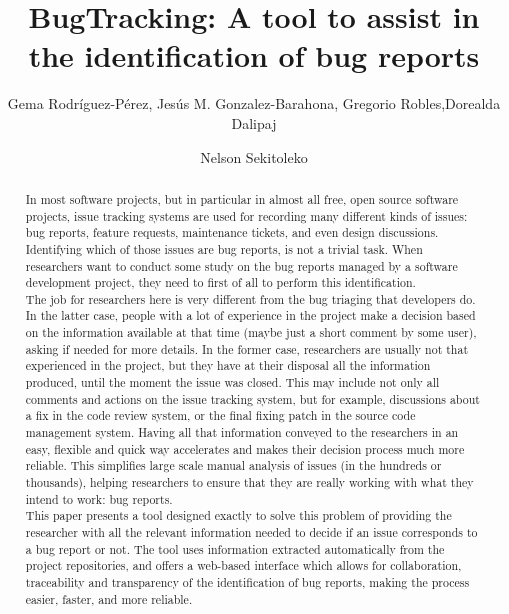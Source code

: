 \documentclass[ifip]{svmult}
\begin{document}
\title*{BugTracking: A tool to assist in the identification of bug reports}
\author{Gema Rodr\'iguez-P\'erez, Jes\'us M. Gonzalez-Barahona, Gregorio Robles,Dorealda Dalipaj \and Nelson Sekitoleko}
%
%
\maketitle

\begin{abstract}
	In most software projects, but in particular in almost all free, open source software projects, issue tracking systems are used for recording many different kinds of issues: bug reports, feature requests, maintenance tickets, and even design discussions. Identifying which of those issues are bug reports, is not a trivial task. When researchers want to conduct some study on the bug reports managed by a software development project, they need to first of all to perform this identification.\\

The job for researchers here is very different from the bug triaging that developers do. In the latter case, people with a lot of experience in the project make a decision based on the information available at that time (maybe just a short comment by some user), asking if needed for more details. In the former case, researchers are usually not that experienced in the project, but they have at their disposal all the information produced, until the moment the issue was closed. This may include not only all comments and actions on the issue tracking system, but for example, discussions about a fix in the code review system, or the final fixing patch in the source code management system. Having all that information conveyed to the researchers in an easy, flexible and quick way accelerates and makes their decision process much more reliable. This simplifies large scale manual analysis of issues (in the hundreds or thousands), helping researchers to ensure that they are really working with what they intend to work: bug reports.\\

This paper presents a tool designed exactly to solve this problem of providing the researcher with all the relevant information needed to decide if an issue corresponds to a bug report or not. The tool uses information extracted automatically from the project repositories, and offers a web-based interface which allows for collaboration, traceability and transparency of the identification of bug reports, making the process easier, faster, and more reliable.
\end{abstract}
\end{document}
